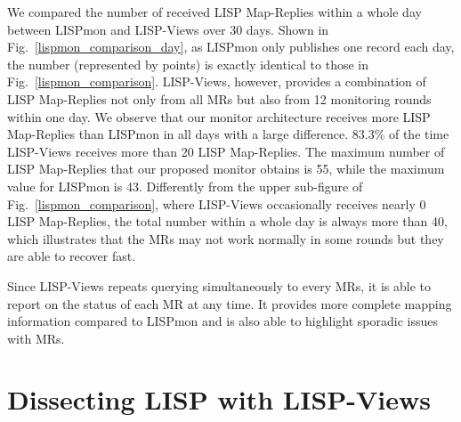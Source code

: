 We compared the number of received LISP Map-Replies within a whole day between LISPmon and LISP-Views over 30 days. Shown in Fig.~\ref{lispmon_comparison_day}, as LISPmon only publishes one record each day, the number (represented by points) is exactly identical to those in Fig.~\ref{lispmon_comparison}. LISP-Views, however, provides a combination of LISP Map-Replies not only from all MRs but also from 12 monitoring rounds within one day. We observe that our monitor architecture receives more LISP Map-Replies than LISPmon in all days with a large difference. 83.3\% of the time LISP-Views receives more than 20 LISP Map-Replies. The maximum number of LISP Map-Replies that our proposed monitor obtains is 55, while the maximum value for LISPmon is 43. Differently from the upper sub-figure of Fig.~\ref{lispmon_comparison}, where LISP-Views occasionally receives nearly 0 LISP Map-Replies, the total number within a whole day is always more than 40, which illustrates that the MRs may not work normally in some rounds but they are able to recover fast. 

Since LISP-Views repeats querying simultaneously to every MRs, it is able to report on the status of each MR at any time. It provides more complete mapping information compared to LISPmon and is also able to highlight sporadic issues with MRs.


\section{Dissecting LISP with LISP-Views}
\label{sec:lispviews_results}

